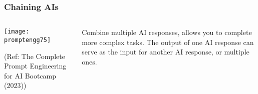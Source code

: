 \begin{frame}[fragile]\frametitle{Chaining AIs}

\begin{columns}
    \begin{column}[T]{0.6\linewidth}
		\begin{center}
		\texttt{[image: promptengg75]}

		{\tiny (Ref: The Complete Prompt Engineering for AI Bootcamp (2023))}
		\end{center}	
    \end{column}
    \begin{column}[T]{0.4\linewidth}
		Combine multiple AI responses, allows you to complete more complex tasks.
		The output of one AI response can serve as the input for another AI response, or multiple ones.
    \end{column}
  \end{columns}
\end{frame}






